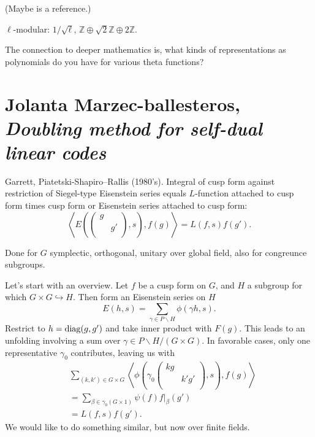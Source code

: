 \documentclass[reqno]{amsart} 
\begin{document}
(Maybe \cite{MR2966067} is a reference.)

$\ell$-modular: $1 / \sqrt{\ell}$, $\mathbb{Z} \oplus \sqrt{2} \mathbb{Z} \oplus 2 \mathbb{Z}$.

The connection to deeper mathematics is, what kinds of representations as polynomials do you have for various theta functions?

\section{Jolanta Marzec-ballesteros, \textnormal{\emph{Doubling method for self-dual linear codes}}}

Garrett, Piatetski-Shapiro--Rallis (1980's).  Integral of cusp form against restriction of Siegel-type Eisenstein series equals $L$-function attached to cusp form times cusp form or Eisenstein series attached to cusp form:
\begin{equation*}
  \left\langle E \left(
      \begin{pmatrix}
        g &  \\
          & g' \\
      \end{pmatrix}, s \right),
    f(g)\right\rangle
  = L(f, s) f(g ').
\end{equation*}

Done for $G$ symplectic, orthogonal, unitary over global field, also for congreunce subgroups.

Let's start with an overview.  Let $f$ be a cusp form on $G$, and $H$ a subgroup for which $G \times G \hookrightarrow H$.  Then form an Eisenstein series on $H$
\begin{equation*}
  E(h, s) = \sum_{\gamma \in P \backslash H} \phi(\gamma h, s).
\end{equation*}
Restrict to $h = \operatorname{diag}(g, g')$ and take inner product with $F(g)$.  This leads to an unfolding involving a sum over $\gamma \in P \backslash H /(G \times G)$.  In favorable cases, only one representative $\gamma_0$ contributes, leaving us with
\begin{align*}
  &\sum_{(k, k') \in G \times G}
    \left\langle \phi \left( \gamma_0
    \begin{pmatrix}
      k g        &  \\
                 & k ' g ' \\
    \end{pmatrix}, s \right), f(g) \right\rangle
  \\
  &=
    \sum_{\beta \in \gamma_0(G \times 1)}
    \psi(f) f |_\beta(g ') \\
  &= L(f, s) f(g ').
\end{align*}
We would like to do something similar, but now over finite fields.
\end{document}

